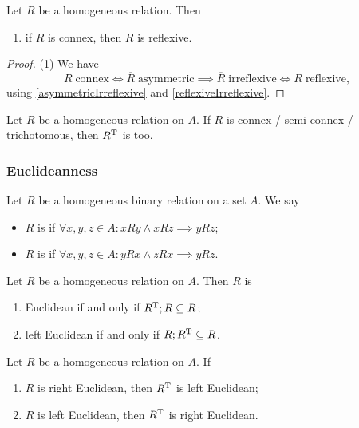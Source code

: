 \begin{corollary} \label{connexityConsequences}
Let $R$ be a homogeneous relation. Then
\begin{enumerate}
\item if $R$ is connex, then $R$ is reflexive.
\end{enumerate}
\end{corollary}
\begin{proof}
(1) We have
\[ R \; \text{connex} \iff \overline{R} \; \text{asymmetric} \implies \overline{R} \; \text{irreflexive} \iff R \; \text{reflexive}, \]
using \ref{asymmetricIrreflexive} and \ref{reflexiveIrreflexive}. 
\end{proof}

\begin{lemma}
Let $R$ be a homogeneous relation on $A$. If $R$ is connex / semi-connex / trichotomous, then $R^{\mathrm{T}}$ is too.
\end{lemma}

\subsubsection{Euclideanness}
\begin{definition}
Let $R$ be a homogeneous binary relation on a set $A$. We say
\begin{itemize}
\item $R$ is  if $\forall x,y,z\in A: xRy \land xRz \implies yRz$;
\item $R$ is  if $\forall x,y,z\in A: yRx \land zRx \implies yRz$.
\end{itemize}
\end{definition}

\begin{lemma}
Let $R$ be a homogeneous relation on $A$. Then $R$ is
\begin{enumerate}
\item Euclidean \textup{if and only if} $R^{\mathrm{T}}; R \subseteq R$;
\item left Euclidean \textup{if and only if} $R; R^{\mathrm{T}} \subseteq R$.
\end{enumerate}
\end{lemma}
\begin{lemma}
Let $R$ be a homogeneous relation on $A$. If
\begin{enumerate}
\item $R$ is right Euclidean, then $R^{\mathrm{T}}$ is left Euclidean;
\item $R$ is left Euclidean, then $R^{\mathrm{T}}$ is right Euclidean.
\end{enumerate}
\end{lemma}

